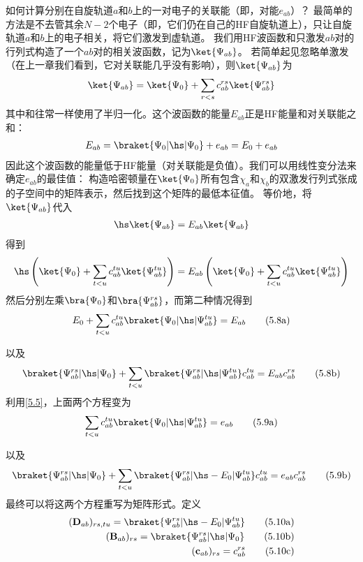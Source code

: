 如何计算分别在自旋轨道$a$和$b$上的一对电子的关联能（即，对能$e_{ab}$）？
最简单的方法是不去管其余$N-2$个电子（即，它们仍在自己的HF自旋轨道上），只让自旋轨道$a$和$b$上的电子相关，将它们激发到虚轨道。
我们用HF波函数和只激发$ab$对的行列式构造了一个$ab$对的相关波函数，记为$\ket{\Psi_{ab}}$。
若简单起见忽略单激发（在上一章我们看到，它对关联能几乎没有影响），则$\ket{\Psi_{ab}}$为
\begin{align}
    \ket{\Psi_{ab}}=\ket{\Psi_0}+\sum_{r<s}c^{rs}_{ab}\ket{\Psi_{ab}^{rs}}
\end{align}
其中和往常一样使用了半归一化。这个波函数的能量$E_{ab}$正是HF能量和对关联能之和：
\begin{align}
    \label{5.5}
    E_{ab}=\braket{\Psi_0|\hs|\Psi_0}+e_{ab}=E_0+e_{ab}
\end{align}
因此这个波函数的能量低于HF能量（对关联能是负值）。我们可以用线性变分法来确定$e_{ab}$的最佳值：
构造哈密顿量在$\ket{\Psi_0}$所有包含$\chi_a$和$\chi_b$的双激发行列式张成的子空间中的矩阵表示，然后找到这个矩阵的最低本征值。
等价地，将$\ket{\Psi_{ab}}$代入
\begin{align}
    \hs\ket{\Psi_{ab}}=E_{ab}\ket{\Psi_{ab}}
\end{align}
得到
\begin{align}
    \hs\left(\ket{\Psi_0}+\sum_{t<u}c^{tu}_{ab}\ket{\Psi_{ab}^{tu}}\right)=E_{ab}\left(\ket{\Psi_0}+\sum_{t<u}c^{tu}_{ab}\ket{\Psi_{ab}^{tu}}\right)
\end{align}
然后分别左乘$\bra{\Psi_0}$和$\bra{\Psi^{rs}_{ab}}$，而第二种情况得到
\begin{align}
    E_0+\sum_{t<u}c^{tu}_{ab}\braket{\Psi_0|\hs|\Psi_{ab}^{tu}}=E_{ab}\tag{5.8a}
\end{align}
\addtocounter{equation}{1}
以及
\begin{align}
    \braket{\Psi_{ab}^{rs}|\hs|\Psi_0}+\sum_{t<u}\braket{\Psi_{ab}^{rs}|\hs|\Psi_{ab}^{tu}}c^{tu}_{ab}=E_{ab}c^{rs}_{ab}\tag{5.8b}
\end{align}
利用\autoref{5.5}，上面两个方程变为
\begin{align}
    \label{5.9a}
    \sum_{t<u}c^{tu}_{ab}\braket{\Psi_0|\hs|\Psi_{ab}^{tu}}=e_{ab}\tag{5.9a}
\end{align}
\addtocounter{equation}{1}
以及
\begin{align}
    \label{5.9b}
    \braket{\Psi_{ab}^{rs}|\hs|\Psi_0}+\sum_{t<u}\braket{\Psi_{ab}^{rs}|\hs-E_0|\Psi_{ab}^{tu}}c^{tu}_{ab}=e_{ab}c^{rs}_{ab}\tag{5.9b}
\end{align}
最终可以将这两个方程重写为矩阵形式。定义
\begin{align}
    (\mathbf{D}_{ab})_{rs,tu}=\braket{\Psi_{ab}^{rs}|\hs-E_0|\Psi_{ab}^{tu}}\tag{5.10a}\\
    (\mathbf{B}_{ab})_{rs}=\braket{\Psi_{ab}^{rs}|\hs|\Psi_0}\tag{5.10b}\\
    (\mathbf{c}_{ab})_{rs}=c_{ab}^{rs}\tag{5.10c}
\end{align}
